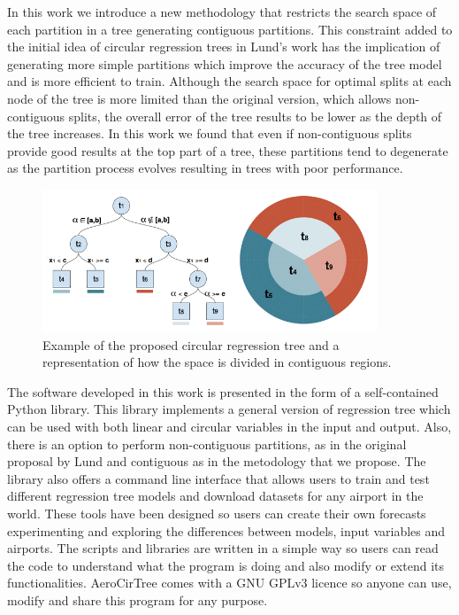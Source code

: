 In this work we introduce a new methodology that restricts the search space of each partition in a tree generating contiguous partitions. This constraint added to the initial idea of circular regression trees in Lund's work \citep{lund2002tree} has the implication of generating more simple partitions which improve the accuracy of the tree model and is more efficient to train. Although the search space for optimal splits at each node of the tree is more limited than the original version, which allows non-contiguous splits, the overall error of the tree results to be lower as the depth of the tree increases. In this work we found that even if non-contiguous splits provide good results at the top part of a tree, these partitions tend to degenerate as the partition process evolves resulting in trees with poor performance.

\begin{figure}[h]
 \centerline{\includegraphics[width=10cm]{paper2.png}}\caption{Example of the proposed circular regression tree and a representation of how the space is divided in contiguous regions.}\label{paper2}
\end{figure}

The software developed in this work is presented in the form of a self-contained Python library. This library implements a general version of regression tree which can be used with both linear and circular variables in the input and output. Also, there is an option to perform non-contiguous partitions, as in the original proposal by Lund and contiguous as in the metodology that we propose.  The library also offers a command line interface that allows users to train and test different regression tree models and download datasets for any airport in the world. These tools have been designed so users can create their own forecasts experimenting and exploring the differences between models, input variables and airports. The scripts and libraries are written in a simple way so users can read the code to understand what the program is doing and also modify or extend its functionalities. AeroCirTree comes with a GNU GPLv3 licence so anyone can use, modify and share this program for any purpose.

